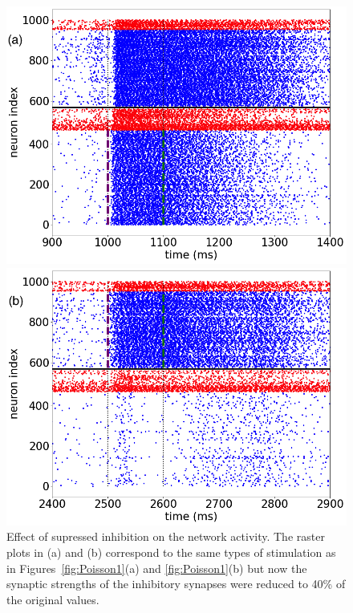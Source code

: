\begin{figure}[H]
    \centering
    \begin{minipage}[b]{0.45\textwidth}
    \includegraphics[scale=0.25]{poissonmod1.png}
    \end{minipage}
    \hfill
    \begin{minipage}[b]{0.5\textwidth}
        \includegraphics[scale=0.25]{poissonmod2.png}
    \end{minipage}
    \caption{Effect of supressed inhibition on the network activity. The raster plots in (a) and (b) correspond to the same types of stimulation as in Figures~\ref{fig:Poisson1}(a) and \ref{fig:Poisson1}(b) but now the synaptic strengths of the inhibitory synapses were reduced to 40\% of the original values.}
    \label{fig:Poisson2}
\end{figure}

